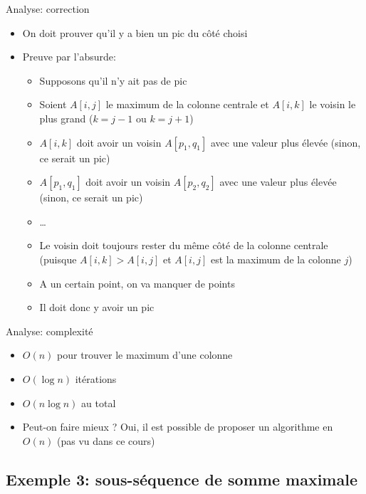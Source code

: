 \begin{frame}{Analyse: correction}

\begin{itemize}
\item On doit prouver qu'il y a bien un pic du côté choisi
\item Preuve par l'absurde:
\begin{itemize}
\item Supposons qu'il n'y ait pas de pic
\item Soient $A[i,j]$ le maximum de la colonne centrale et $A[i,k]$ le voisin le plus grand ($k=j-1$ ou $k=j+1$)
\item $A[i,k]$ doit avoir un voisin $A[p_1,q_1]$ avec une valeur plus élevée (sinon, ce serait un pic)
\item $A[p_1,q_1]$ doit avoir un voisin $A[p_2,q_2]$ avec une valeur plus élevée (sinon, ce serait un pic)
\item \ldots
\item Le voisin doit toujours rester du même côté de la colonne centrale (puisque $A[i,k]>A[i,j]$ et $A[i,j]$ est la maximum de la colonne $j$)
\item A un certain point, on va manquer de points
\item Il doit donc y avoir un pic
\end{itemize}
\end{itemize}

\end{frame}

\begin{frame}{Analyse: complexité}

\begin{itemize}
\item $O(n)$ pour trouver le maximum d'une colonne
\item $O(\log n)$ itérations
\item $O(n\log n)$ au total
\bigskip

\item Peut-on faire mieux ? Oui, il est possible de proposer un algorithme en $O(n)$ (pas vu dans ce cours)
\end{itemize}

\end{frame}

\subsection{Exemple 3: sous-séquence de somme maximale}

